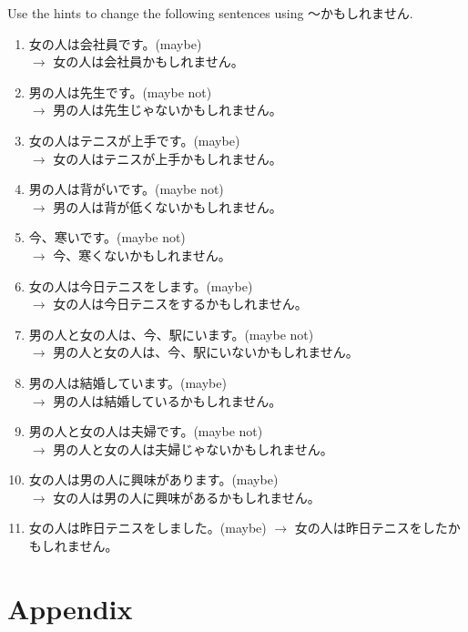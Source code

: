 \documentclass[notoc,notitlepage]{tufte-book}
\begin{document}
\begin{ex}
  Use the hints to change the following sentences using 〜かもしれません.

  \begin{enumerate}
    \item 女の人は会社員です。(maybe) \\
      $\to$ 女の人は会社員かもしれません。
    \item 男の人は先生です。(maybe not) \\
      $\to$ 男の人は先生じゃないかもしれません。
    \item 女の人はテニスが上手です。(maybe) \\
      $\to$ 女の人はテニスが上手かもしれません。
    \item 男の人は背がいです。(maybe not) \\
      $\to$ 男の人は背が低くないかもしれません。
    \item 今、寒いです。(maybe not) \\
      $\to$ 今、寒くないかもしれません。
    \item 女の人は今日テニスをします。(maybe) \\
      $\to$ 女の人は今日テニスをするかもしれません。
    \item 男の人と女の人は、今、駅にいます。(maybe not) \\
      $\to$ 男の人と女の人は、今、駅にいないかもしれません。
    \item 男の人は結婚しています。(maybe) \\
      $\to$ 男の人は結婚しているかもしれません。
    \item 男の人と女の人は夫婦です。(maybe not) \\
      $\to$ 男の人と女の人は夫婦じゃないかもしれません。
    \item 女の人は男の人に興味があります。(maybe) \\
      $\to$ 女の人は男の人に興味があるかもしれません。
    \item 女の人は昨日テニスをしました。(maybe)
      $\to$ 女の人は昨日テニスをしたかもしれません。
  \end{enumerate}
\end{ex}



\chapter*{Appendix}%
\label{chp:appendix}
\end{document}
